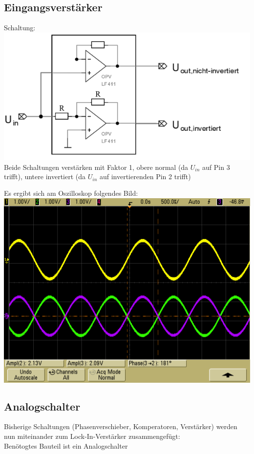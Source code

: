 \documentclass[compress,11pt]{beamer}
\begin{document}
\subsection{Eingangsverstärker}
\begin{frame}
Schaltung:\\
\includegraphics[width=.7\textwidth]{schalt/eingangs}\\
Beide Schaltungen verstärken mit Faktor 1, obere normal (da $U_{in}$ auf Pin 3 trifft), untere invertiert (da $U_{in}$ auf invertierenden Pin 2 trifft)
\end{frame}
\begin{frame}
Es ergibt sich am Oszilloskop folgendes Bild:\\
\includegraphics[width=.7\textwidth]{../oszi/scope_8}
\end{frame}

\subsection{Analogschalter}
\begin{frame}
Bisherige Schaltungen (Phasenverschieber, Komperatoren, Verstärker) werden nun miteinander zum Lock-In-Verstärker zusammengefügt:\\
Benötogtes Bauteil ist ein Analogschalter
\end{frame}
\end{document}
